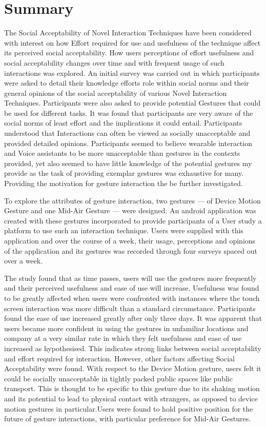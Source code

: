 \documentclass{l4proj}
\begin{document}
\section{Summary}
The Social Acceptability of Novel Interaction Techniques have been considered with interest on how Effort required for use and usefulness of the technique affect its perceived social acceptability. How users perceptions of effort usefulness and social acceptability changes over time and with frequent usage of such interactions was explored. An initial survey was carried out in which participants were asked to detail their knowledge efforts role within social norms and their general opinions of the social acceptability of various Novel Interaction Techniques. Participants were also asked to provide potential Gestures that could be used for different tasks. It was found that participants are very aware of the social norms of least effort and the implications it could entail. Participants understood that Interactions can often be viewed as socially unacceptable and provided detailed opinions. Participants seemed to believe wearable interaction and Voice assistants to be more unacceptable than gestures in the contexts provided, yet also seemed to have little knowledge of the potential gestures my provide as the task of providing exemplar gestures was exhaustive for many. Providing the motivation for gesture interaction the be further investigated.

To explore the attributes of gesture interaction, two gestures --- of Device Motion Gesture and one Mid-Air Gesture --- were designed. An android application was created with these gestures incorporated to provide participants of a User study a platform to use such an interaction technique. Users were supplied with this application and over the course of a week, their usage, perceptions and opinions of the application and its gestures was recorded through four surveys spaced out over a week.

The study found that as time passes, users will use the gestures more frequently and their perceived usefulness and ease of use will increase. Usefulness was found to be greatly affected when users were confronted with instances where the touch screen interaction was more difficult than a standard circumstance. Participants found the ease of use increased greatly after only three days. It was apparent that users became more confident in using the gestures in unfamiliar locations and company at a very similar rate in which they felt usefulness and ease of use increased as hypothesised. This indicates strong links between social acceptability and effort required for interaction. However, other factors affecting Social Acceptability were found. With respect to the Device Motion gesture, users felt it could be socially unacceptable in tightly packed public spaces like public transport. This is thought to be specific to this gesture due to its shaking motion and its potential to lead to physical contact with strangers, as opposed to device motion gestures in particular.Users were found to hold positive position for the future of gesture interactions, with particular preference for Mid-Air Gestures. 
\end{document}
